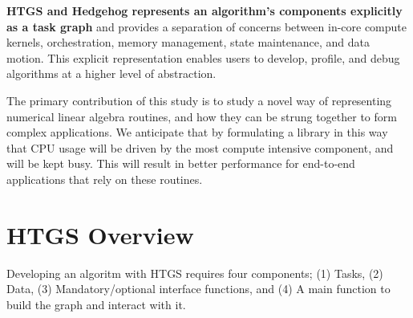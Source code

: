 \documentclass[]{article}
\begin{document}
\textbf{HTGS and Hedgehog represents an algorithm's components explicitly as a task graph} and provides a separation of concerns between in-core compute kernels, orchestration, memory management, state maintenance, and data motion. This explicit representation enables users to develop, profile, and debug algorithms at a higher level of abstraction.

The primary contribution of this study is to study a novel way of representing numerical linear algebra routines, and how they can be strung together to form complex applications. We anticipate that by formulating a library in this way that CPU usage will be driven by the most compute intensive component, and will be kept busy. This will result in better performance for end-to-end applications that rely on these routines.


\section{HTGS Overview}

Developing an algoritm with HTGS requires four components; (1) Tasks, (2) Data, (3) Mandatory/optional interface functions, and (4) A main function to build the graph and interact with it. 
\end{document}
